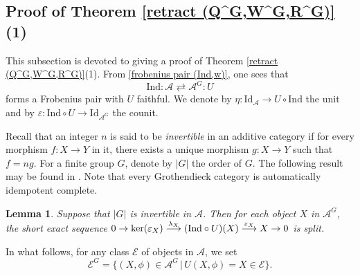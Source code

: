 \documentclass[12pt,twoside]{amsart}
\theoremstyle{bfupright head,slanted body}
\theoremstyle{bfupright head,upright body}
\theoremstyle{fixed bf head,slanted body}
\newtheorem{lem}[res]{Lemma}            \newtheorem*{lem*}{Lemma}
\theoremstyle{fixed bf head,upright body}
\theoremstyle{numbered paragraph}
\numberwithin{equation}{res}
\newcommand{\calA}{\mathcal{A}}
\newcommand{\calE}{\mathcal{E}}
\newcommand{\Ind}{\mathrm{Ind}}
\newcommand{\Id}{\mathrm{Id}}
\newcommand{\kernel}{\mbox{\rm ker}}
\begin{document}
\subsection{Proof of Theorem \ref{retract (Q^G,W^G,R^G)}(1)} \label{Thm A(1)}
This subsection is devoted to giving a proof of Theorem \ref{retract (Q^G,W^G,R^G)}(1).
From \ref{frobenius pair (Ind,w)}, one sees that
\[
\Ind : \calA \rightleftarrows \calA^G : U
\]
forms a Frobenius pair with \(U\) faithful. We denote by \(\eta: \Id_{\calA} \to U \circ \Ind\) the unit and by \(\varepsilon: \Ind \circ U \to \Id_{\calA^G}\) the counit.

Recall that an integer \(n\) is said to be \emph{invertible} in an additive category if for every morphism \(f:X\to Y\) in it, there exists a unique morphism \(g:X\to Y\) such that \(f=ng\).
For a finite group \(G\), denote by \(|G|\) the order of \(G\). The following result may be found in \cite[Lemma 2.14]{2019Sun}. Note that every Grothendieck category is automatically idempotent complete.

\begin{lem} \label{split cond}
Suppose that $|G|$ is invertible in $\calA$.
Then for each object $X$ in $\calA^G$, the short exact sequence
\(
0  \to  \kernel(\varepsilon_X)  \overset{\lambda_X} \longrightarrow      (\Ind \circ U)(X)
                                \overset{\varepsilon_X} \longrightarrow  X  \to  0
\)
is split.
\end{lem}

In what follows, for any class $\calE$ of objects in $\calA$, we set
\[
\calE^G = \{(X, \phi) \in \calA^G \,|\, U(X, \phi) = X \in \calE \}.
\]
\end{document}
